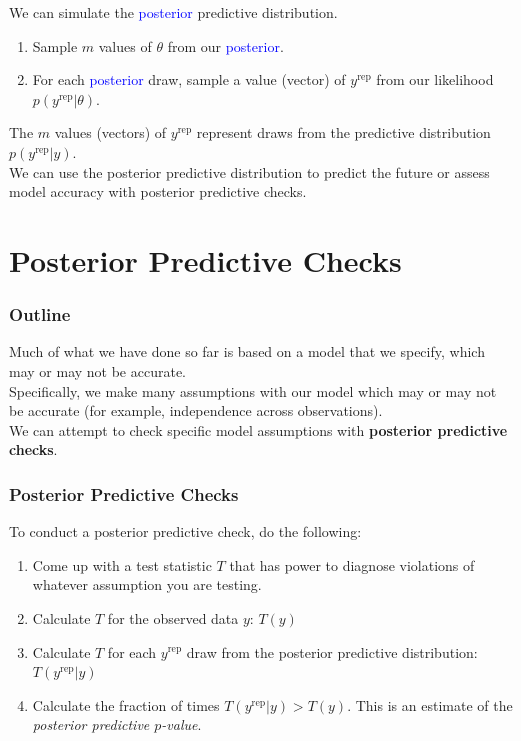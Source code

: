 \documentclass{beamer}
\begin{document}
\begin{frame}[fragile]
We can simulate the \textcolor{blue}{posterior} predictive distribution.
\pause
\bigskip
\begin{enumerate}
\item Sample $m$ values of $\theta$ from our \textcolor{blue}{posterior}.
\pause
\item For each \textcolor{blue}{posterior} draw, sample a value (vector) of
$y^{\mathrm{rep}}$ from our likelihood $p(y^{\mathrm{rep}} | \theta)$.
\end{enumerate}
\bigskip
\pause
The $m$ values (vectors) of $y^{\mathrm{rep}}$ represent draws from
the  predictive distribution $p(y^{\mathrm{rep}} | y)$.\\
\pause
\bigskip
We can use the posterior predictive distribution to predict the future
or assess model accuracy with posterior predictive checks.
\end{frame}

\section{Posterior Predictive Checks}

\begin{frame}
\frametitle{Outline}
\tableofcontents[currentsection]
\end{frame}

\begin{frame}
Much of what we have done so far is based on
a model that we specify, which may or may not be accurate. \\
\bigskip
\pause
Specifically, we make many assumptions with our model which may or may
not be accurate (for example, independence across observations). \\
\bigskip
\pause
We can attempt to check specific model assumptions with \textbf{posterior predictive checks}.
\end{frame}

\begin{frame}
\frametitle{Posterior Predictive Checks}
\pause
To conduct a posterior predictive check, do the following:
\medskip
\pause
\begin{enumerate}
\item Come up with a test statistic $T$ that has power to diagnose
violations of whatever assumption you are testing. 
\medskip
\pause
\item Calculate $T$ for the observed data $y$: \pause $T(y)$
\medskip
\pause
\item Calculate $T$ for each $y^{\mathrm{rep}}$ draw from the
posterior predictive distribution: \pause $T(y^{\mathrm{rep}} | y)$
\medskip
\pause
\item Calculate the fraction of times $T(y^{\mathrm{rep}} | y) >
T(y)$.  \pause  This is an estimate of the \textit{posterior
predictive $p$-value}. 
\end{enumerate}
\end{frame}
\end{document}
